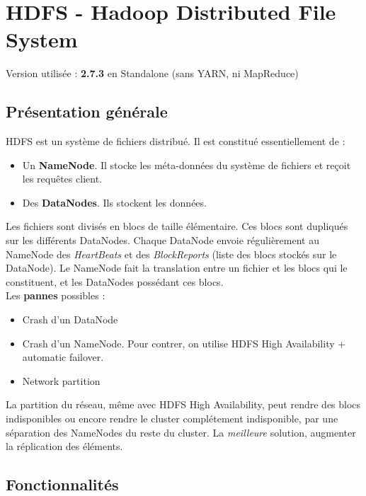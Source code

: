 \section{HDFS - Hadoop Distributed File System}

Version utilisée : \textbf{2.7.3} en Standalone (sans YARN, ni MapReduce)

\subsection{Présentation générale}

HDFS est un système de fichiers distribué. Il est constitué essentiellement de :

\begin{itemize}
	\item Un \textbf{NameNode}. Il stocke les méta-données du système de fichiers et reçoit les requêtes client.
	\item Des \textbf{DataNodes}. Ils stockent les données.\\
\end{itemize}

Les fichiers sont divisés en blocs de taille élémentaire. Ces blocs sont dupliqués sur les différents DataNodes. Chaque DataNode envoie régulièrement au NameNode des \textit{HeartBeats} et des \textit{BlockReports} (liste des blocs stockés sur le DataNode). Le NameNode fait la translation entre un fichier et les blocs qui le constituent, et les DataNodes possédant ces blocs.\\

Les \textbf{pannes} possibles :

\begin{itemize}
	\item Crash d'un DataNode
	\item Crash d'un NameNode. Pour contrer, on utilise HDFS High Availability + automatic failover.
	\item Network partition\\
\end{itemize}

La partition du réseau, même avec HDFS High Availability, peut rendre des blocs indisponibles ou encore rendre le cluster complétement indisponible, par une séparation des NameNodes du reste du cluster. La \textit{meilleure} solution, augmenter la réplication des éléments.

\subsection{Fonctionnalités}

